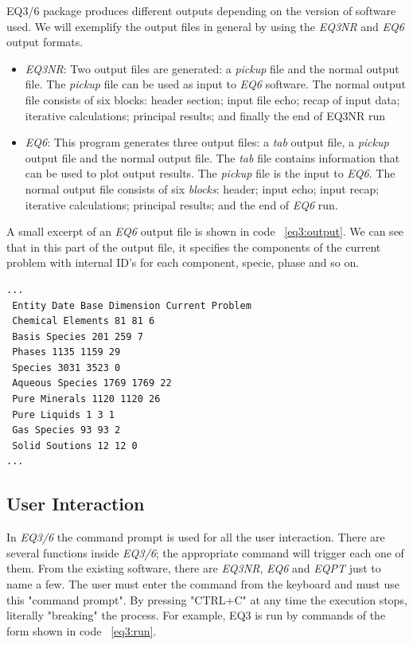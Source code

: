 EQ3/6 package produces different outputs depending on the version of software used. We will exemplify the output files in general by using the \emph{EQ3NR} and \emph{EQ6} output formats. 
\begin{itemize}
\item \emph{EQ3NR}: Two output files are generated: a \emph{pickup} file and the normal output file. The \emph{pickup} file can be used as input to \emph{EQ6} software. The normal output file consists of six blocks: header section; input file echo; recap of input data; iterative calculations; principal results; and finally the end of EQ3NR run
\item \emph{EQ6}: This program generates three output files: a \emph{tab} output file, a \emph{pickup} output file and the normal output file. The \emph{tab} file contains information that can be used to plot output results. The \emph{pickup} file is the input to \emph{EQ6}. The normal output file consists of six \emph{blocks}: header; input echo; input recap; iterative calculations; principal results; and the end of \emph{EQ6} run.
\end{itemize}

A small excerpt of an \emph{EQ6} output file is shown in code ~\ref{eq3:output}. We can see that in this part of the output file, it specifies the components of the current problem with internal ID's for each component, specie, phase and so on.

\begin{minipage}[c]{0.92\textwidth}
\begin{lstlisting}[frame=single, caption=Excerpt of \emph{EQ6} output file, label=eq3:output]
...
 Entity Date Base Dimension Current Problem
 Chemical Elements 81 81 6
 Basis Species 201 259 7
 Phases 1135 1159 29
 Species 3031 3523 0
 Aqueous Species 1769 1769 22
 Pure Minerals 1120 1120 26
 Pure Liquids 1 3 1
 Gas Species 93 93 2
 Solid Soutions 12 12 0
...
\end{lstlisting}
\end{minipage}

\subsection{User Interaction}
In \emph{EQ3/6} the command prompt is used for all the user interaction. There are several functions inside \emph{EQ3/6}; the appropriate command will trigger each one of them. From the existing software, there are \emph{EQ3NR}, \emph{EQ6} and \emph{EQPT} just to name a few. The user must enter the command from the keyboard and must use this "command prompt". By pressing "CTRL+C" at any time the execution stops, literally "breaking" the process. For example, EQ3 is run by commands of the form shown in code ~\ref{eq3:run}.


